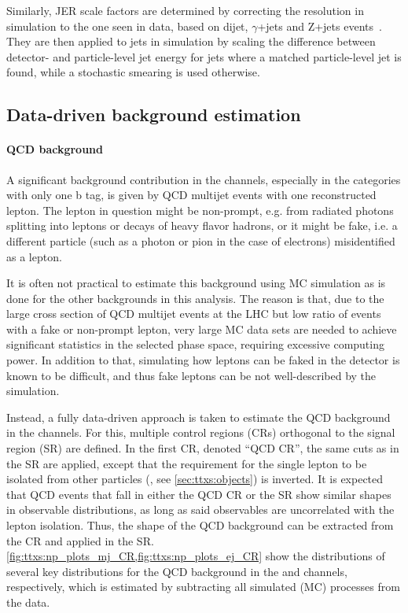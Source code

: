 Similarly, JER scale factors are determined by correcting the resolution in simulation to the one seen in data, based on dijet, $\gamma$+jets and Z+jets events~\cite{CMS:JME-10-011}. They are then applied to jets in simulation by scaling the difference between detector- and particle-level jet energy for jets where a matched particle-level jet is found, while a stochastic smearing is used otherwise.


\subsection{Data-driven background estimation}
\label{sec:ttxs:datadriven}

\paragraph{QCD background}

A significant background contribution in the \ljets channels, especially in the categories with only one b tag, is given by QCD multijet events with one reconstructed lepton. The lepton in question might be non-prompt, e.g. from radiated photons splitting into leptons or decays of heavy flavor hadrons, or it might be fake, i.e. a different particle (such as a photon or pion in the case of electrons) misidentified as a lepton.

It is often not practical to estimate this background using MC simulation as is done for the other backgrounds in this analysis. The reason is that, due to the large cross section of QCD multijet events at the LHC but low ratio of events with a fake or non-prompt lepton, very large MC data sets are needed to achieve significant statistics in the selected phase space, requiring excessive computing power. In addition to that, 
simulating how leptons can be faked in the detector is known to be difficult, and thus 
fake leptons can be not well-described by the simulation.

Instead, a fully data-driven approach is taken to estimate the QCD background in the \ljets channels. For this, multiple control regions (CRs) orthogonal to the signal region (SR) are defined. In the first CR, denoted ``QCD CR'', the same cuts as in the SR are applied, except that the requirement for the single lepton to be isolated from other particles (\Irel, see \cref{sec:ttxs:objects}) is inverted. It is expected that QCD events that fall in either the QCD CR or the SR show similar shapes in observable distributions, as long as said observables are uncorrelated with the lepton isolation. Thus, the shape of the QCD background can be extracted from the CR and applied in the SR. \cref{fig:ttxs:np_plots_mj_CR,fig:ttxs:np_plots_ej_CR} show the distributions of several key distributions for the QCD background in the \mujets and \ejets channels, respectively, which is estimated by subtracting all simulated (MC) processes from the data.

